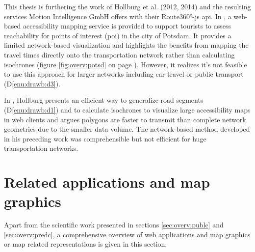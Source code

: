     This thesis is furthering the work of Hollburg et al. (2012,
    2014) and the resulting services Motion Intelligence GmbH offers with their
    Route360°-\acrshort{js} \acrshort{api}. In \cite{hollburghier}, a web-based
    accessibility mapping service is provided to support tourists to assess
    reachability for points of interest (\acrshort{poi}) in the city of Potsdam.
    It provides a
    limited network-based visualization and highlights the benefits from
    mapping the travel times directly onto the transportation network rather
    than calculating isochrones (figure \ref{fig:overv:potsd} on page
    \pageref{fig:overv:potsd}). However, it
    realizes it's not feasible to use this approach for larger networks
    including car travel or public transport (D\ref{enu:drawb:d3}).\par

    In \cite{Hollburg2014}, Hollburg
    presents an efficient way to generalize road segments (D\ref{enu:drawb:d1})
    and to calculate
    isochrones to visualize large accessibility maps in web clients and argues
    polygons are faster to transmit than complete network geometries due to the
    smaller data volume. The network-based method developed in his preceding
    work was comprehensible but not efficient for huge transportation networks.

  \section{Related applications and map graphics}
    \label{sec:overv:applc}



    Apart from the scientific work presented in sections \ref{sec:overv:publc}
    and \ref{sec:overv:predc}, a comprehensive overview of web applications
    and map graphics or map related representations is given in this
    section.\par


